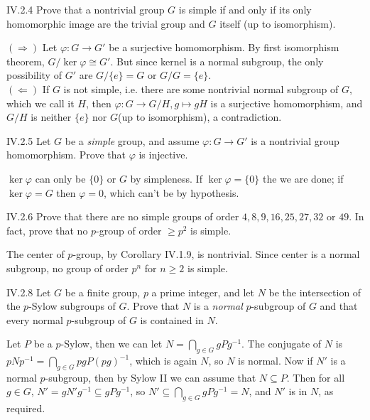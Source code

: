 \begin{problem}{IV.2.4}
Prove that a nontrivial group $G$ is simple if and only if its only homomorphic image are the trivial group and $G$ itself (up to isomorphism).
\end{problem}
\begin{pf}

\noindent $(\Rightarrow)$ Let $\varphi : G \to G'$ be a surjective homomorphism. By first isomorphism theorem, $G/\ker \varphi \cong G'$. But since kernel is a normal subgroup, the only possibility of $G'$ are $G/\{e\} = G$ or $G/G = \{e\}$. \\
$(\Leftarrow)$ If $G$ is not simple, i.e. there are some nontrivial normal subgroup of $G$, which we call it $H$, then $\varphi : G \to G/H,g \mapsto gH$ is a surjective homomorphism, and $G/H$ is neither $\{e\}$ nor $G$(up to isomorphism), a contradiction. 
\end{pf}

\begin{problem}{IV.2.5}
Let $G$ be a \emph{simple} group, and assume $\varphi: G \to G'$ is a nontrivial group homomorphism. Prove that $\varphi$ is injective.
\end{problem}
\begin{pf}
$\ker \varphi$ can only be $\{0\}$ or $G$ by simpleness. If $\ker \varphi = \{0\}$ the we are done; if $\ker \varphi = G$ then $\varphi = 0$, which can't be by hypothesis.
\end{pf}

\begin{problem}{IV.2.6}
Prove that there are no simple groups of order $4, 8, 9, 16, 25, 27, 32$ or $49$. In fact, prove that no $p$-group of order $\geq p^2$ is simple.
\end{problem}
\begin{pf}
The center of $p$-group, by Corollary IV.1.9, is nontrivial. Since center is a normal subgroup, no group of order $p^n$ for $n \geq 2$ is simple.    
\end{pf}

\begin{problem}{IV.2.8}
Let $G$ be a finite group, $p$ a prime integer, and let $N$ be the intersection of the $p$-Sylow subgroups of $G$. Prove that $N$ is a \emph{normal} $p$-subgroup of $G$ and that every normal $p$-subgroup of $G$ is contained in $N$.
\end{problem}
\begin{pf}
Let $P$ be a $p$-Sylow, then we can let $N = \bigcap_{g \in G}gPg^{-1}$. The conjugate of $N$ is $pNp^{-1} = \bigcap_{g \in G}pgP(pg)^{-1}$, which is again $N$, so $N$ is normal. Now if $N'$ is a normal $p$-subgroup, then by Sylow II we can assume that $N \subseteq P$. Then for all $g \in G$, $N' = gN'g^{-1} \subseteq gPg^{-1}$, so $N' \subseteq \bigcap_{g \in G}gPg^{-1} = N$, and $N'$ is in $N$, as required. 
\end{pf}


